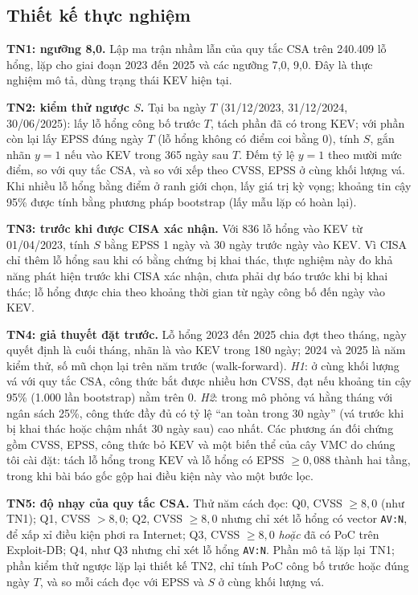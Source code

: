 \documentclass[conference]{IEEEtran}
\begin{document}
\subsection{Thiết kế thực nghiệm}
\textbf{TN1: ngưỡng 8,0.} Lập ma trận nhầm lẫn của quy tắc CSA trên 240.409 lỗ hổng, lặp cho giai
đoạn 2023 đến 2025 và các ngưỡng 7,0, 9,0. Đây là thực nghiệm mô tả, dùng trạng thái KEV hiện tại.

\textbf{TN2: kiểm thử ngược $S$.} Tại ba ngày $T$ (31/12/2023, 31/12/2024, 30/06/2025): lấy lỗ
hổng công bố trước $T$, tách phần đã có trong KEV; với phần còn lại lấy EPSS đúng ngày $T$ (lỗ hổng
không có điểm coi bằng 0), tính $S$, gắn nhãn $y=1$ nếu vào KEV trong 365 ngày sau $T$. Đếm tỷ lệ
$y=1$ theo mười mức điểm, so với quy tắc CSA, và so với xếp theo CVSS, EPSS ở cùng khối lượng vá.
Khi nhiều lỗ hổng bằng điểm ở ranh giới chọn, lấy giá trị kỳ vọng; khoảng tin cậy 95\% được tính bằng phương pháp bootstrap (lấy mẫu lặp có hoàn lại).

\textbf{TN3: trước khi được CISA xác nhận.} Với 836 lỗ hổng vào KEV từ 01/04/2023, tính $S$ bằng
EPSS 1 ngày và 30 ngày trước ngày vào KEV. Vì CISA chỉ thêm lỗ hổng sau khi có bằng chứng bị khai
thác, thực nghiệm này đo khả năng phát hiện trước khi CISA xác nhận, chưa phải dự báo trước khi bị
khai thác; lỗ hổng được chia theo khoảng thời gian từ ngày công bố đến ngày vào KEV.

\textbf{TN4: giả thuyết đặt trước.} Lỗ hổng 2023 đến 2025 chia đợt theo tháng, ngày quyết định là
cuối tháng, nhãn là vào KEV trong 180 ngày; 2024 và 2025 là năm kiểm thử, số mũ chọn lại trên năm
trước (walk-forward). \emph{H1}: ở cùng khối lượng vá với quy tắc CSA, công thức bắt được nhiều
hơn CVSS, đạt nếu khoảng tin cậy 95\% (1.000 lần bootstrap) nằm trên 0. \emph{H2}: trong mô phỏng
vá hằng tháng với ngân sách 25\%, công thức đầy đủ có tỷ lệ ``an toàn trong 30 ngày'' (vá trước
khi bị khai thác hoặc chậm nhất 30 ngày sau) cao nhất. Các phương án đối chứng gồm CVSS, EPSS, công thức bỏ KEV
và một biến thể của cây VMC do chúng tôi cài đặt: tách lỗ hổng trong KEV và lỗ hổng có EPSS
$\ge 0{,}088$ thành hai tầng, trong khi bài báo gốc gộp hai điều kiện này vào một bước lọc.

\textbf{TN5: độ nhạy của quy tắc CSA.} Thử năm cách đọc: Q0, CVSS $\ge 8{,}0$ (như TN1); Q1,
CVSS $> 8{,}0$; Q2, CVSS $\ge 8{,}0$ nhưng chỉ xét lỗ hổng có vector \texttt{AV:N}, để xấp xỉ điều kiện phơi ra Internet; Q3, CVSS $\ge 8{,}0$ \emph{hoặc} đã có PoC trên Exploit-DB; Q4, như
Q3 nhưng chỉ xét lỗ hổng \texttt{AV:N}. Phần mô tả lặp lại TN1; phần kiểm thử ngược lặp lại thiết
kế TN2, chỉ tính PoC công bố trước hoặc đúng ngày $T$, và so mỗi cách đọc với EPSS và $S$ ở cùng
khối lượng vá.
\end{document}
